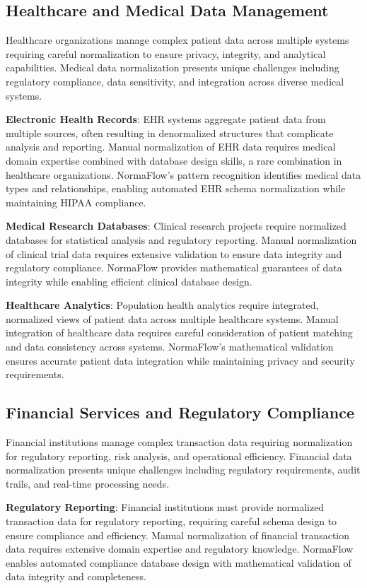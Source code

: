 \documentclass[acmsmall]{acmart}
\newcommand{\parab}[1]{\vspace{0.05in}\noindent\textbf{#1}}
\begin{document}
\subsection{Healthcare and Medical Data Management}

Healthcare organizations manage complex patient data across multiple systems requiring careful normalization to ensure privacy, integrity, and analytical capabilities. Medical data normalization presents unique challenges including regulatory compliance, data sensitivity, and integration across diverse medical systems.

\parab{Electronic Health Records}: EHR systems aggregate patient data from multiple sources, often resulting in denormalized structures that complicate analysis and reporting. Manual normalization of EHR data requires medical domain expertise combined with database design skills, a rare combination in healthcare organizations. NormaFlow's pattern recognition identifies medical data types and relationships, enabling automated EHR schema normalization while maintaining HIPAA compliance.

\parab{Medical Research Databases}: Clinical research projects require normalized databases for statistical analysis and regulatory reporting. Manual normalization of clinical trial data requires extensive validation to ensure data integrity and regulatory compliance. NormaFlow provides mathematical guarantees of data integrity while enabling efficient clinical database design.

\parab{Healthcare Analytics}: Population health analytics require integrated, normalized views of patient data across multiple healthcare systems. Manual integration of healthcare data requires careful consideration of patient matching and data consistency across systems. NormaFlow's mathematical validation ensures accurate patient data integration while maintaining privacy and security requirements.

\subsection{Financial Services and Regulatory Compliance}

Financial institutions manage complex transaction data requiring normalization for regulatory reporting, risk analysis, and operational efficiency. Financial data normalization presents unique challenges including regulatory requirements, audit trails, and real-time processing needs.

\parab{Regulatory Reporting}: Financial institutions must provide normalized transaction data for regulatory reporting, requiring careful schema design to ensure compliance and efficiency. Manual normalization of financial transaction data requires extensive domain expertise and regulatory knowledge. NormaFlow enables automated compliance database design with mathematical validation of data integrity and completeness.
\end{document}
